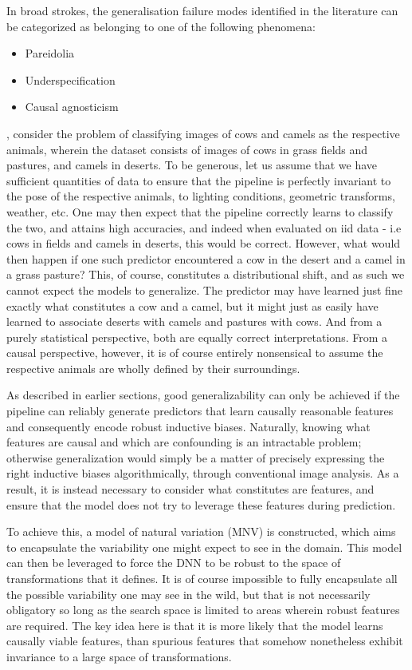 	In broad strokes, the generalisation failure modes identified in the literature can be categorized as belonging to one of the following phenomena:
		\begin{itemize}
			\item Pareidolia
			\item Underspecification
			\item Causal agnosticism 
		\end{itemize}
		
		, consider the problem of classifying images of cows and camels as the respective animals, wherein the dataset consists of images of cows in grass fields and pastures, and camels in deserts. To be generous, let us assume that we have sufficient quantities of data to ensure that the pipeline is perfectly invariant to the pose of the respective animals, to lighting conditions, geometric transforms, weather, etc. One may then expect that the pipeline correctly learns to classify the two, and attains high accuracies, and indeed when evaluated on iid data - i.e cows in fields and camels in deserts, this would be correct. However, what would then happen if one such predictor encountered a cow in the desert and a camel in a grass pasture? This, of course, constitutes a distributional shift, and as such we cannot expect the models to generalize. The predictor may have learned just fine exactly what constitutes a cow and a camel, but it might just as easily have learned to associate deserts with camels and pastures with cows. And from a purely statistical perspective, both are equally correct interpretations. From a causal perspective, however, it is of course entirely nonsensical to assume the respective animals are wholly defined by their surroundings.


		As described in earlier sections, good generalizability can only be achieved if the pipeline can reliably generate predictors that learn causally reasonable features and consequently encode robust inductive biases. Naturally, knowing what features are causal and which are confounding is an intractable problem; otherwise generalization would simply be a matter of precisely expressing the right inductive biases algorithmically, through conventional image analysis. As a result, it is instead necessary to consider what constitutes are  features, and ensure that the model does not try to leverage these features during prediction. 

		To achieve this, a model of natural variation (MNV) is constructed, which aims to encapsulate the variability one might expect to see in the domain. This model can then be leveraged to force the DNN to be robust to the space of transformations that it defines. It is of course impossible to fully encapsulate all the possible variability one may see in the wild, but that is not necessarily obligatory so long as the search space is limited to areas wherein robust features are required. The key idea here is that it is more likely that the model learns causally viable features, than spurious features that somehow nonetheless exhibit invariance to a large space of transformations. 
		
